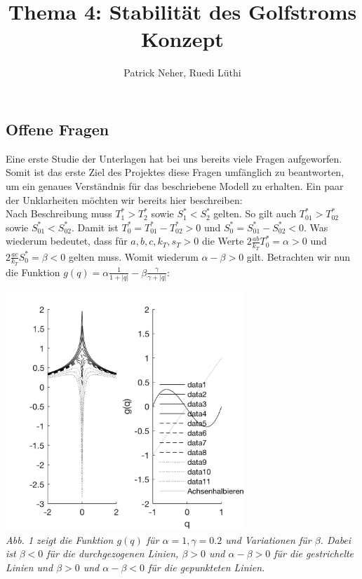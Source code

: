 \documentclass[10pt,a4paper]{article}
\author{Patrick Neher, Ruedi Lüthi}
\title{Thema 4: Stabilität des Golfstroms \\ \textbf{Konzept} }
\begin{document}
	\maketitle

	\subsection*{Offene Fragen}

	Eine erste Studie der Unterlagen hat bei uns bereits viele Fragen aufgeworfen. Somit ist das erste Ziel des Projektes diese Fragen umfänglich zu beantworten, um ein genaues Verständnis für das beschriebene Modell zu erhalten. Ein paar der Unklarheiten möchten wir bereits hier beschreiben:\\
	
	Nach Beschreibung muss \(T^*_1 > T^*_2\) sowie \(S^*_1 < S^*_2\) gelten. So gilt auch \(T^*_{01} > T^*_{02}\) sowie \(S^*_{01} < S^*_{02}\). Damit ist \(T^*_0 = T^*_{01} - T^*_{02} > 0\) und \(S^*_0 = S^*_{01} - S^*_{02} < 0\). Was wiederum bedeutet, dass für \(a, b, c, k_T, s_T > 0\) die Werte \(2\frac{ab}{k_T}T^*_0 = \alpha > 0\) und  \(2\frac{ac}{k_T}S^*_0 = \beta < 0\) gelten muss. Womit wiederum \(\alpha - \beta > 0\) gilt. Betrachten wir nun die Funktion \(g(q) = \alpha \frac{1}{1+|q|} - \beta \frac{\gamma}{\gamma + |q|} \):

	\begin{center}
	\includegraphics[width=9cm]{Diagramme/g_von_q.png} \\
	\textit{Abb. 1 zeigt die Funktion \(g(q)\) für \(\alpha = 1, \gamma = 0.2\) und Variationen für \(\beta\). Dabei ist \(\beta < 0\) für die durchgezogenen Linien, \(\beta > 0\) und \(\alpha - \beta > 0\) für die gestrichelte Linien und \(\beta > 0\) und \(\alpha - \beta < 0\) für die gepunkteten Linien.}
	\end{center}
	
\end{document}
